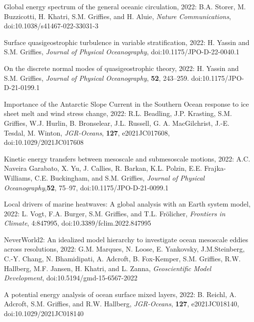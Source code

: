\begin{etaremune}
\item Global energy spectrum of the general oceanic circulation, 2022: B.A. Storer, M. Buzzicotti, H. Khatri, S.M. Grif\/f\/ies, and H. Aluie, {\it Nature Communications}, 
doi:10.1038/s41467-022-33031-3



\item Surface quasigeostrophic turbulence in variable stratification, 2022: H. Yassin and S.M. Grif\/f\/ies,  {\it Journal of Physical Oceanography}, doi:10.1175/JPO-D-22-0040.1

\item On the discrete normal modes of quasigeostrophic theory, 2022: H. Yassin and S.M. Grif\/f\/ies,  {\it Journal of Physical Oceanography}, {\bf 52}, 243--259.  doi:10.1175/JPO-D-21-0199.1

\item Importance of the Antarctic Slope Current in the Southern Ocean response to ice sheet melt and wind stress change, 2022: R.L. Beadling, J.P. Krasting, S.M. Grif\/f\/ies, W.J. Hurlin, B. Bronselear, J.L. Russell, G. A. MacGilchrist, J.-E. Tesdal, M. Winton, {\it JGR-Oceans}, {\bf 127}, e2021JC017608, doi:10.1029/2021JC017608

\item Kinetic energy transfers between mesoscale and submesoscale motions, 2022: A.C. Naveira Garabato, X. Yu, J. Callies, R. Barkan, K.L. Polzin, E.E. Frajka-Williams, C.E. Buckingham, and S.M. Grif\/f\/ies, {\it Journal of Physical Oceanography},{\bf 52}, 75--97, doi:10.1175/JPO-D-21-0099.1

\item Local drivers of marine heatwaves: A global analysis with an Earth system model, 2022: L. Vogt, F.A. Burger, S.M. Grif\/f\/ies, and T.L. {Fr\"{o}licher}, {\it Frontiers in Climate}, 4:847995, doi:10.3389/fclim.2022.847995

\item NeverWorld2: An idealized model hierarchy to investigate ocean mesoscale eddies across resolutions, 2022: G.M. Marques, N. Loose, E. Yankovsky, J.M.Steinberg, C.-Y. Chang, N. Bhamidipati, A. Adcroft, B. Fox-Kemper, S.M. Griffies, R.W. Hallberg, M.F. Jansen, H. Khatri, and L. Zanna, {\it Geoscientific Model Development}, doi:10.5194/gmd-15-6567-2022

\item A potential energy analysis of ocean surface mixed layers, 2022: B. Reichl, A. Adcroft, S.M. Grif\/f\/ies, and R.W. Hallberg, {\it JGR-Oceans}, {\bf 127}, e2021JC018140, doi:10.1029/2021JC018140


\end{etaremune}
